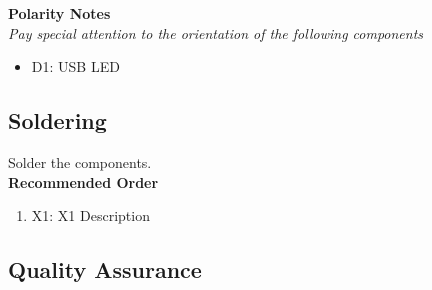 \documentclass{article}
\begin{document}
\noindent \textbf{Polarity Notes}\\
\noindent \textit{Pay special attention to the orientation of the following components}
\begin{itemize}
  \item D1: USB LED
\end{itemize}

\subsection{Soldering}

Solder the components. \\

\noindent \textbf{Recommended Order}

\begin{enumerate}
  \item X1: X1 Description
\end{enumerate}
\subsection{Quality Assurance}
\end{document}
